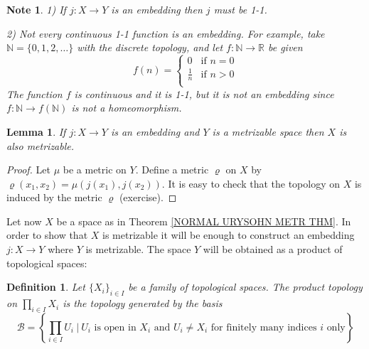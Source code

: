 \documentclass[11pt, letterpaper, oneside]{report}
\theoremstyle{pplain}
\newtheorem{lemma}[theorem]{Lemma}
\newtheorem{ITERMVALUE THM}[theorem]{Intermediate Value Theorem}
\newtheorem{HEINEBOREL THM}[theorem]{Heine-Borel Theorem}
\newtheorem{UMETR THM}[theorem]{Urysohn Metrization Theorem}
\newtheorem{UMETR2 THM}[theorem]{Urysohn Metrization Theorem (v.2)}
\theoremstyle{ddefinition}
\newtheorem{definition}[theorem]{Definition}
\newtheorem{note}[theorem]{Note}
\theoremstyle{nnn}
\newtheorem{TDA NN}[theorem]{Topological Data Analysis. }
\theoremstyle{eexercise}
\newcommand{\N}{{\mathbb N}}
\newcommand{\R}{{\mathbb R}}
\newcommand{\BB}{{\mathcal B}}
\begin{document}
\begin{note}
1) If $j\colon X\to Y$ is an embedding then $j$ must be 1-1. 

2) Not every continuous 1-1 function is an embedding. For example, take 
$\N = \{0, 1, 2, \dots\}$ with the discrete topology, and let 
$f\colon \N \to \R$ be given 
$$
f(n) = 
\begin{cases}
0 & \text{if $n = 0$} \\
\tfrac{1}{n} & \text{if $n >0$} \\
\end{cases}
$$
The function $f$ is  continuous and it is 1-1, but  it is not an embedding since 
$f\colon \N \to f(\N)$ is not a homeomorphism. 
\end{note}


\begin{lemma}
\label{EBM INTO METRIC LEMMA}
If $j\colon X\to Y$ is an embedding and $Y$ is a metrizable space then $X$ is also metrizable. 
\end{lemma}

\begin{proof}
Let $\mu$ be a metric on $Y$. Define a metric $\varrho$ on $X$ by 
$\varrho(x_{1}, x_{2}) = \mu(j(x_{1}), j(x_{2}))$. It is easy to check that the topology on 
$X$ is induced by the metric $\varrho$ (exercise).
\end{proof}


Let now $X$ be a space as in Theorem \ref{NORMAL URYSOHN METR THM}. In order to 
show that $X$ is metrizable it will be enough to construct an embedding 
$j\colon X\to Y$ where $Y$ is metrizable. The space $Y$ will be obtained as a product 
of  topological spaces:


\begin{definition}
\label{PROD TOP} 
Let $\{X_{i}\}_{i\in I}$ be a family of topological spaces. The \emph{product topology} on 
$\prod_{i\in I} X_{i}$  is the topology generated by the basis
$$\BB = \textstyle{\left\{ \prod_{i\in I} U_{i}  \ | \ \text{$U_{i}$ is open in $X_{i}$ and 
$U_{i} \neq X_{i}$ for finitely many indices $i$ only}\right\}}$$
\end{definition}
\end{document}

